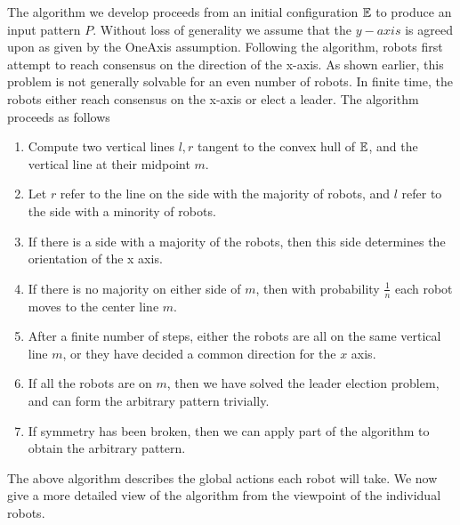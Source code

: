 \documentclass[preprint,10pt]{elsarticle}
\begin{document}
	The algorithm we develop proceeds from an initial configuration $\mathbb{E}$ to produce an input pattern $P$.
	Without loss of generality we assume that the $y-axis$ is agreed upon as given by the OneAxis assumption.
	Following the algorithm, robots first attempt to reach consensus on the direction of the x-axis. 
	As shown earlier, this problem is not generally solvable for an even number of robots. In finite time, 
	the robots either reach consensus on the x-axis or elect a leader. The algorithm proceeds as follows
	\begin{enumerate}
		\item Compute two vertical lines $l,r$ tangent to the convex hull of $\mathbb{E}$, and the vertical line
		at their midpoint $m$. 
		\item Let $r$ refer to the line on the side with the majority of robots, and $l$ refer to the side
		with a minority of robots.
		\item If there is a side with a majority of the robots, then this side determines the orientation of
		the x axis.
		\item If there is no majority on either side of $m$, then with probability $\frac{1}{n}$ 
		each robot moves to the center line $m$. 
		\item After a finite number of steps, either the robots are all on the same vertical line $m$,
		or they have decided a common direction for the $x$ axis.
		\item If all the robots are on $m$, then we have solved the leader election problem, and 
		can form the arbitrary pattern trivially.
		\item If symmetry has been broken, then we can apply part of the \cite{flocchini12distrib}
		algorithm to obtain the arbitrary pattern.
	\end{enumerate}

	The above algorithm describes the global actions each robot will take. We now give a more detailed view
	of the algorithm from the viewpoint of the individual robots.
\end{document}
